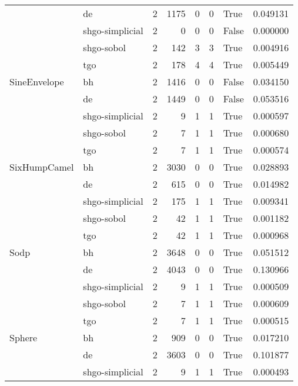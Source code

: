 \begin{longtable}{llrrrrlr}
         & de &     2 &     1175 &      0 &       0 &    True &    0.049131 \\
         & shgo-simplicial &     2 &        0 &      0 &       0 &   False &    0.000000 \\
         & shgo-sobol &     2 &      142 &      3 &       3 &    True &    0.004916 \\
         & tgo &     2 &      178 &      4 &       4 &    True &    0.005449 \\
SineEnvelope & bh &     2 &     1416 &      0 &       0 &   False &    0.034150 \\
         & de &     2 &     1449 &      0 &       0 &   False &    0.053516 \\
         & shgo-simplicial &     2 &        9 &      1 &       1 &    True &    0.000597 \\
         & shgo-sobol &     2 &        7 &      1 &       1 &    True &    0.000680 \\
         & tgo &     2 &        7 &      1 &       1 &    True &    0.000574 \\
SixHumpCamel & bh &     2 &     3030 &      0 &       0 &    True &    0.028893 \\
         & de &     2 &      615 &      0 &       0 &    True &    0.014982 \\
         & shgo-simplicial &     2 &      175 &      1 &       1 &    True &    0.009341 \\
         & shgo-sobol &     2 &       42 &      1 &       1 &    True &    0.001182 \\
         & tgo &     2 &       42 &      1 &       1 &    True &    0.000968 \\
Sodp & bh &     2 &     3648 &      0 &       0 &    True &    0.051512 \\
         & de &     2 &     4043 &      0 &       0 &    True &    0.130966 \\
         & shgo-simplicial &     2 &        9 &      1 &       1 &    True &    0.000509 \\
         & shgo-sobol &     2 &        7 &      1 &       1 &    True &    0.000609 \\
         & tgo &     2 &        7 &      1 &       1 &    True &    0.000515 \\
Sphere & bh &     2 &      909 &      0 &       0 &    True &    0.017210 \\
         & de &     2 &     3603 &      0 &       0 &    True &    0.101877 \\
         & shgo-simplicial &     2 &        9 &      1 &       1 &    True &    0.000493 \\

\end{longtable}
